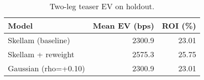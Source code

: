 \begin{table}[t]
  \centering
  \small
  \caption{Two-leg teaser EV on holdout.}
  \begin{tabular}{lrr}
    \toprule
    Model & Mean EV (bps) & ROI (\%) \\
    \midrule
    Skellam (baseline) & 2300.9 & 23.01 \\
    Skellam + reweight & 2575.3 & 25.75 \\
    Gaussian (rho=+0.10) & 2300.9 & 23.01 \\
    \bottomrule
  \end{tabular}
\end{table}
